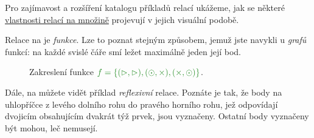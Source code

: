 Pro zajímavost a rozšíření katalogu příkladů relací ukážeme, jak se některé
\hyperref[def:vlastnosti-relaci-na-mnozine]{vlastnosti relací na množině}
projevují v jejich visuální podobě.

Relace na  je \emph{funkce}. Lze to
poznat stejným způsobem, jemuž jste navykli u \emph{grafů} funkcí: na každé
svislé čáře smí ležet maximálně jeden její bod.
\begin{figure}[ht]
  \centering

  \caption{Zakreslení funkce $\clg{f = \{(\vartriangleright,
  \vartriangleright), (\odot, \times), (\times, \odot)\}}$.}
  \label{fig:nakresleni-funkce-mriz}
\end{figure}

Dále, na  můžete vidět příklad
\emph{reflexivní} relace. Poznáte je tak, že body na uhlopříčce z levého dolního
rohu do pravého horního rohu, jež odpovídají dvojicím obsahujícím dvakrát týž
prvek, jsou vyznačeny. Ostatní body vyznačeny být mohou, leč nemusejí.

